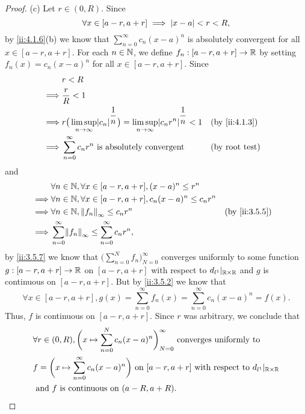 \begin{proof}{(c)}
  Let \(r \in (0, R)\).
  Since
  \[
    \forall x \in [a - r, a + r] \implies \left\lvert x - a\right\rvert < r < R,
  \]
  by \cref{ii:4.1.6}(b) we know that \(\sum_{n = 0}^\infty c_n (x - a)^n\) is absolutely convergent for all \(x \in [a - r, a + r]\).
  For each \(n \in \mathbb{N}\), we define \(f_n : [a - r, a + r] \to \mathbb{R}\) by setting \(f_n(x) = c_n (x - a)^n\) for all \(x \in [a - r, a + r]\).
  Since
  \begin{align*}
             & r < R                                                                                                                                            \\
    \implies & \dfrac{r}{R} < 1                                                                                                                                 \\
    \implies & r \big(\limsup_{n \to \infty} \abs{c_n}^{\dfrac{1}{n}}\big) = \limsup_{n \to \infty} \abs{c_n r^n}^{\dfrac{1}{n}} < 1 &  & \by{ii:4.1.3}         \\
    \implies & \sum_{n = 0}^\infty c_n r^n \text{ is absolutely convergent}                                                          &  & \text{(by root test)}
  \end{align*}
  and
  \begin{align*}
             & \forall n \in \N, \forall x \in [a - r, a + r], (x - a)^n \leq r^n                            \\
    \implies & \forall n \in \N, \forall x \in [a - r, a + r], c_n (x - a)^n \leq c_n r^n                    \\
    \implies & \forall n \in \N, \norm*{f_n}_\infty \leq c_n r^n                          &  & \by{ii:3.5.5} \\
    \implies & \sum_{n = 0}^\infty \norm*{f_n}_\infty \leq \sum_{n = 0}^\infty c_n r^n,
  \end{align*}
  by \cref{ii:3.5.7} we know that \(\big(\sum_{n = 0}^N f_n\big)_{N = 0}^\infty\) converges uniformly to some function \(g : [a - r, a + r] \to \mathbb{R}\) on \([a - r, a + r]\) with respect to \(d_{l^1}|_{\mathbb{R} \times \mathbb{R}}\) and \(g\) is continuous on \([a - r, a + r]\).
  But by \cref{ii:3.5.2} we know that
  \[
    \forall x \in [a - r, a + r], g(x) = \sum_{n = 0}^\infty f_n(x) = \sum_{n = 0}^\infty c_n (x - a)^n = f(x).
  \]
  Thus, \(f\) is continuous on \([a - r, a + r]\).
  Since \(r\) was arbitrary, we conclude that
  \begin{align*}
     & \forall r \in (0, R), \bigg(x \mapsto \sum_{n = 0}^N c_n (x - a)^n\bigg)_{N = 0}^\infty \text{ converges uniformly to }                 \\
     & f = \bigg(x \mapsto \sum_{n = 0}^\infty c_n (x - a)^n\bigg) \text{ on } [a - r, a + r] \text{ with respect to } d_{l^1}|_{\mathbb{R} \times \mathbb{R}} \\
     & \text{ and } f \text{ is continuous on } (a - R, a + R).
  \end{align*}
\end{proof}

